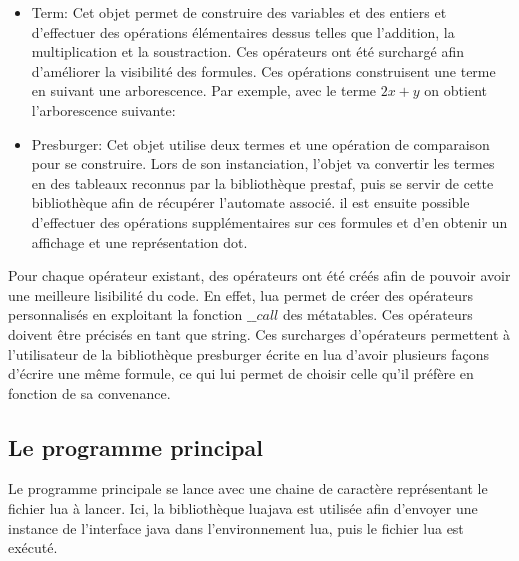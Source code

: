 \begin{itemize}
	\item Term: Cet objet permet de construire des variables et des entiers et d’effectuer des opérations élémentaires dessus telles que l’addition, la multiplication et la soustraction. Ces opérateurs ont été surchargé afin d’améliorer la visibilité des formules. Ces opérations construisent une terme en suivant une arborescence. Par exemple, avec le terme $2x + y$ on obtient l’arborescence suivante:
	\begin{figure}[h]
		\centering
	\end{figure}

	\item Presburger: Cet objet utilise deux termes et une opération de comparaison pour se construire.
	Lors de son instanciation, l’objet va convertir les termes en des tableaux reconnus par la bibliothèque prestaf, puis se servir de cette bibliothèque afin de récupérer l’automate associé. il est ensuite possible d’effectuer des opérations supplémentaires sur ces formules et d’en obtenir un affichage et une représentation dot.

\end{itemize}

Pour chaque opérateur existant, des opérateurs ont été créés afin de pouvoir avoir une meilleure lisibilité du code. En effet, lua permet de créer des opérateurs personnalisés en exploitant la fonction $\_\_call$ des métatables. Ces opérateurs doivent être précisés en tant que string. Ces surcharges d’opérateurs permettent à l’utilisateur de la bibliothèque presburger écrite en lua d’avoir plusieurs façons d’écrire une même formule, ce qui lui permet de choisir celle qu’il préfère en fonction de sa convenance. 

\subsection{Le programme principal}

Le programme principale se lance avec une chaine de caractère représentant le fichier lua à lancer. Ici, la bibliothèque luajava est utilisée afin d’envoyer une instance de l’interface java dans l’environnement lua, puis le fichier lua est exécuté.
